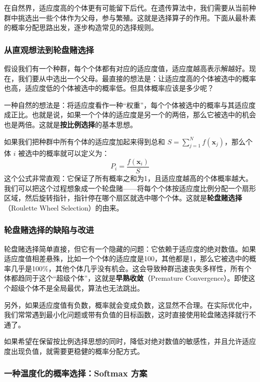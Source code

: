 \documentclass[lang=cn,zihao=-4,a4paper,fontset=windows]{beautybook}
\begin{document}
在自然界，适应度高的个体更有可能留下后代。在遗传算法中，我们需要从当前种群中挑选出一些个体作为父母，参与繁殖。这就是选择算子的作用。下面从最朴素的概率分配思路出发，逐步构造常见的选择规则。

\subsubsection{从直观想法到轮盘赌选择}

假设我们有一个种群，每个个体都有对应的适应度值，适应度越高表示解越好。现在，我们要从中选出一个父母。最直接的想法是：让适应度高的个体被选中的概率也高，适应度低的个体被选中的概率低。但具体概率应该是多少呢？

一种自然的想法是：将适应度看作一种“权重”，每个个体被选中的概率与其适应度成正比。也就是说，如果一个个体的适应度是另一个的两倍，那么它被选中的机会也是两倍。这就是\textbf{按比例选择}的基本思想。

如果我们把种群中所有个体的适应度加起来得到总和 \(S = \sum_{j=1}^N f(\mathbf{x}_j)\)，那么个体 \(i\) 被选中的概率就可以定义为：
\[
P_i = \frac{f(\mathbf{x}_i)}{S}
\]
这个公式非常直观：它保证了所有概率之和为1，且适应度越高的个体概率越大。我们可以把这个过程想象成一个轮盘赌——将每个个体按适应度比例分配一个扇形区域，然后旋转指针，指针停在哪个扇区就选中哪个个体。这就是\textbf{轮盘赌选择}（Roulette Wheel Selection）的由来。

\subsubsection{轮盘赌选择的缺陷与改进}

轮盘赌选择简单直接，但它有一个隐藏的问题：它依赖于适应度的绝对数值。如果适应度值相差悬殊，比如一个个体的适应度是100，其他都是1，那么它被选中的概率几乎是100\%，其他个体几乎没有机会。这会导致种群迅速丧失多样性，所有个体都趋同于这个“超级个体”，这就是\textbf{早熟收敛}（Premature Convergence）。即使这个超级个体不是全局最优，算法也无法跳出。

另外，如果适应度值有负数，概率就会变成负数，这显然不合理。在实际优化中，我们常常遇到最小化问题或带有负值的目标函数，这时直接使用轮盘赌选择就行不通了。

如果希望在保留按比例选择思想的同时，降低对绝对数值的敏感性，并且允许适应度出现负值，就需要更稳健的概率分配方式。

\subsubsection{一种温度化的概率选择：Softmax 方案}
\end{document}
